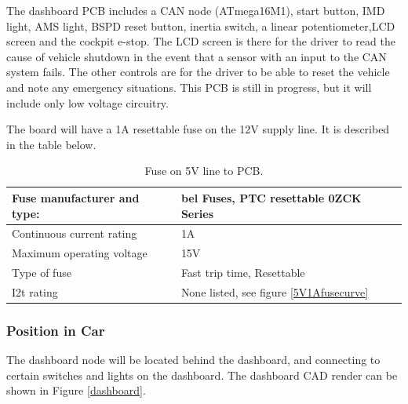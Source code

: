 \documentclass{article}
\begin{document}

            The dashboard PCB includes a CAN node (ATmega16M1), start button, IMD light, AMS light, BSPD reset button, inertia switch, a linear potentiometer,LCD screen and the cockpit e-stop. The LCD screen is there for the driver to read the cause of vehicle shutdown in the event that a sensor with an input to the CAN system fails. The other controls are for the driver to be able to reset the vehicle and note any emergency situations. This PCB is still in progress, but it will include only low voltage circuitry.

            The board will have a 1A resettable fuse on the 12V supply line. It is described in the table below.

            \begin{table}[H]
                \centering
                \begin{tabular}{|l|l|}
                    \hline
                    Fuse manufacturer and type: & bel Fuses, PTC resettable 0ZCK Series\\ \hline
                    Continuous current rating & 1A \\ \hline
                    Maximum operating voltage & 15V \\ \hline
                    Type of fuse & Fast trip time, Resettable \\ \hline
                    I2t rating & None listed, see figure \ref{5V1Afusecurve} \\ \hline
                    \end{tabular}
                \caption{Fuse on 5V line to PCB.}
                \label{5V1Afuse}
            \end{table}

        \subsubsection{Position in Car}

            The dashboard node will be located behind the dashboard, and connecting to certain switches and lights on the dashboard. The dashboard CAD render can be shown in Figure \ref{dashboard}.
\end{document}
